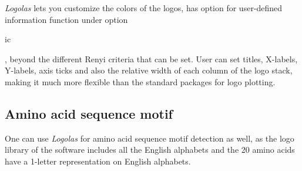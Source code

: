 \documentclass[12pt]{article}\usepackage[]{graphicx}\usepackage[usenames,dvipsnames]{color}
\newcommand{\Logolas}{\textit{Logolas}}
\begin{document}
\newpage

\Logolas{} lets you customize the colors of the logos, has option for user-defined information function under option \begin{verb} ic \end{verb},  beyond the different Renyi criteria that can be set. User can set titles, X-labels, Y-labels, axis ticks and also the relative width of each column of the logo stack, making it much more flexible than the standard packages for logo plotting.

\subsection{Amino acid sequence motif}

One can use \Logolas{} for amino acid sequence motif detection as well, as the logo library of the software includes all the English alphabets and the 20 amino acids have a 1-letter representation on English alphabets.
\end{document}
